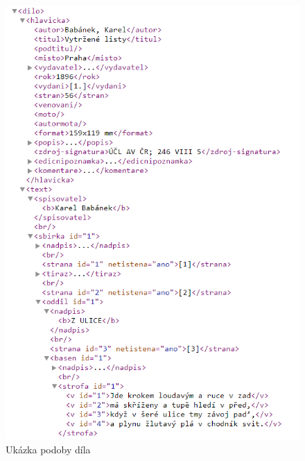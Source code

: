 \documentclass[thesis=B,czech]{FITthesis}[2012/06/26]
\begin{document}
    \begin {figure}[H]\centering
        \includegraphics[width=\textwidth]{images/xml}
        \caption {Ukázka podoby díla}
        \label {fig:xml}
    \end{figure}   
\end{document}
